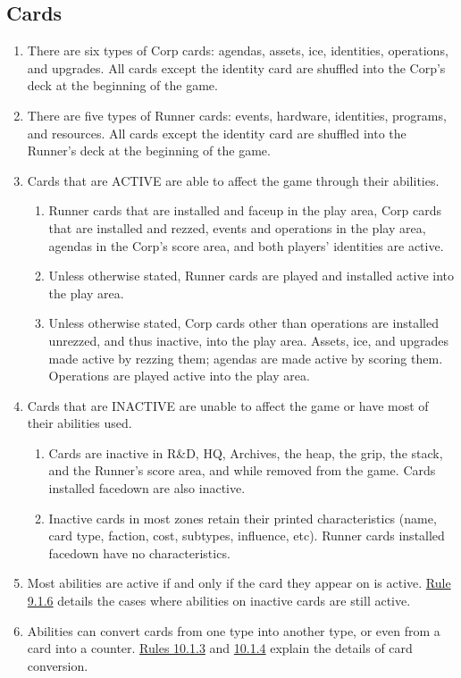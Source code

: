 \subsection{Cards}
\begin{enumerate}
	\item There are six types of Corp cards: agendas, assets, ice, identities, operations, and upgrades. All cards except the identity card are shuffled into the Corp's deck at the beginning of the game.
	\item There are five types of Runner cards: events, hardware, identities, programs, and resources. All cards except the identity card are shuffled into the Runner's deck at the beginning of the game.
	\item Cards that are ACTIVE are able to affect the game through their abilities.
	      \begin{enumerate}
		      \item Runner cards that are installed and faceup in the play area, Corp cards that are installed and rezzed, events and operations in the play area, agendas in the Corp's score area, and both players' identities are active.
		      \item Unless otherwise stated, Runner cards are played and installed active into the play area.
		      \item Unless otherwise stated, Corp cards other than operations are installed unrezzed,	and thus inactive, into the play area. Assets, ice, and upgrades made active by rezzing them; agendas are made active by scoring them. Operations are played active into the play area.
	      \end{enumerate}
	\item Cards that are INACTIVE are unable to affect the game or have most of their abilities	used.
	      \begin{enumerate}
		      \item Cards are inactive in R\&D, HQ, Archives, the heap, the grip, the stack, and the Runner's score area, and while removed from the game. Cards installed facedown are also inactive.
		      \item Inactive cards in most zones retain their printed characteristics (name, card type, faction, cost, subtypes, influence, etc). Runner cards installed facedown have no characteristics.
	      \end{enumerate}
	\item Most abilities are active if and only if the card they appear on is active. \hyperlink{page.i}{Rule 9.1.6} details the cases where abilities on inactive cards are still active.
	\item Abilities can convert cards from one type into another type, or even from a card into a counter. \hyperlink{page.i}{Rules 10.1.3} and \hyperlink{page.i}{10.1.4} explain the details of card conversion.
\end{enumerate}
